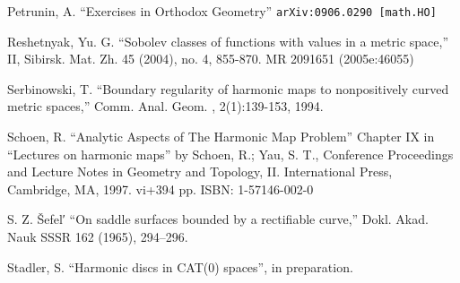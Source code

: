 \documentclass{article}
\begin{document}
\begin{thebibliography}{52}
 Petrunin, A. 
``Exercises in Orthodox Geometry''
{\tt arXiv:0906.0290 [math.HO]}

Reshetnyak, Yu. G. ``Sobolev classes of functions with values in a metric space,'' II, Sibirsk. Mat. Zh. 45 (2004), no. 4, 855-870. MR 2091651 (2005e:46055)

 Serbinowski,  T. ``Boundary regularity of harmonic maps to nonpositively curved metric spaces,''
Comm. Anal. Geom. , 2(1):139-153, 1994.

Schoen, R. ``Analytic Aspects of The Harmonic Map Problem'' Chapter IX in  
``Lectures on harmonic maps'' by Schoen, R.; Yau, S. T.,  
Conference Proceedings and Lecture Notes in Geometry and Topology, II. International Press, Cambridge, MA, 1997. vi+394 pp. ISBN: 1-57146-002-0

 S. Z. \v{S}efel′ ``On saddle surfaces bounded by a rectifiable curve,'' Dokl. Akad. Nauk SSSR 162 (1965), 294--296.


 Stadler, S. ``Harmonic discs in CAT(0) spaces'', in preparation.



\end{thebibliography}
\end{document}
